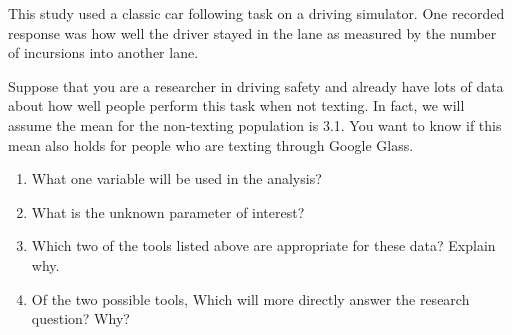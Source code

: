 \begin{alist}
\begin{list}{}{}
    This study used a classic car following task on a driving
    simulator. One recorded response was how well the driver stayed in
    the lane as measured by the number of incursions into another lane.
  \end{list}
  Suppose that you are a researcher in driving safety and already have
  lots of data about how well people perform this task when not
  texting. In fact, we will assume the mean for the non-texting
  population is 3.1.  You want to know if this mean also holds for
  people who are texting through Google Glass.
   \begin{enumerate}
   \item What one variable will be used in the analysis?\vspace{1cm}
   \item What is the unknown parameter of interest?\vspace{1cm}
   \item Which two of the tools listed above are appropriate for these
     data? Explain why.\vspace{2cm}
   \item Of the two possible tools, Which will more directly answer
     the research question? Why? \vspace{1cm}
  \end{enumerate}

\end{alist}






